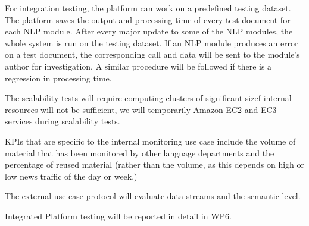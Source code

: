 For integration testing, the platform can work on a predefined testing dataset. The platform saves the output and processing time of every test document for each NLP module. After every major update to some of the NLP modules, the whole system is run on the testing dataset. If an NLP module produces an error on a test document, the corresponding call and data will be sent to the module's author for investigation. A similar procedure will be followed if there is a regression in processing time. 

The scalability tests will require computing clusters of significant sizef internal resources will not be sufficient, we will
temporarily  Amazon EC2 and EC3  services during scalability tests.

KPIs that are specific to the internal monitoring use case include the volume of material that has been monitored by other language departments and the percentage of reused material (rather than the volume, as this depends on high or low news traffic of the day or week.) 

The external use case protocol will evaluate data streams and the semantic level.

Integrated Platform testing will be reported in detail in WP6. 